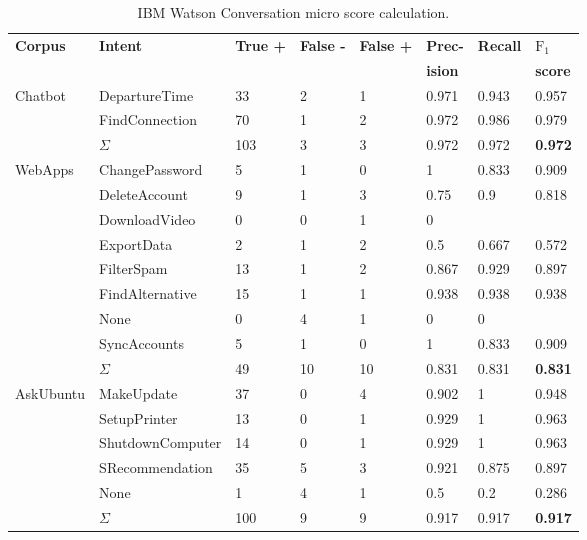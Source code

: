 \begin{table}[htbp]
    \centering
    \begin{tabular}{l l l l l l l l}
        \textbf{Corpus} & \textbf{Intent} & \textbf{True +} & \textbf{False -} & \textbf{False +} & \textbf{Prec-} & \textbf{Recall} & \textbf{$\text{F}_1$}\\
        & & & & & \textbf{ision} & & \textbf{score} \\
        \hline
        \multirow{3}{*}{Chatbot} & DepartureTime & 33 & 2 & 1 & 0.971 & 0.943 & 0.957 \\
        & FindConnection & 70 & 1 & 2 & 0.972 & 0.986 & 0.979 \\
        & $\Sigma$ & 103 & 3 & 3 & 0.972 & 0.972 & \textbf{0.972} \\
        \hline
        \multirow{9}{*}{WebApps} & ChangePassword & 5 & 1 & 0 & 1 & 0.833 & 0.909 \\
        & DeleteAccount & 9 & 1 & 3 & 0.75 & 0.9 & 0.818 \\
        & DownloadVideo & 0 & 0 & 1 & 0 & &  \\
        & ExportData & 2 & 1 & 2 & 0.5 & 0.667 & 0.572 \\
        & FilterSpam & 13 & 1 & 2 & 0.867 & 0.929 & 0.897 \\
        & FindAlternative & 15 & 1 & 1 & 0.938 & 0.938 & 0.938 \\
        & None & 0 & 4 & 1 & 0 & 0 &  \\
        & SyncAccounts & 5 & 1 & 0 & 1 & 0.833 & 0.909 \\
        & $\Sigma$ & 49 & 10 & 10 & 0.831 & 0.831 & \textbf{0.831} \\
        \hline
        \multirow{6}{*}{AskUbuntu} & MakeUpdate & 37 & 0 & 4 & 0.902 & 1 & 0.948 \\
        & SetupPrinter & 13 & 0 & 1 & 0.929 & 1 & 0.963 \\
        & ShutdownComputer & 14 & 0 & 1 & 0.929 & 1 & 0.963 \\
        & SRecommendation & 35 & 5 & 3 & 0.921 & 0.875 & 0.897\\
        & None & 1 & 4 & 1 & 0.5 & 0.2 & 0.286 \\
        & $\Sigma$ & 100 & 9 & 9 & 0.917 & 0.917 & \textbf{0.917}\\
        \hline
    \end{tabular}
    \caption{IBM Watson Conversation micro \fone score calculation.}
    \label{tab:recalculations_watson}
\end{table}

